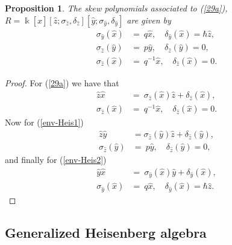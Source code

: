 \documentclass[12pt,a4paper]{article}
\theoremstyle{plain}
\newtheorem{proposition}[theorem]{Proposition}
\theoremstyle{definition}
\theoremstyle{remark}
\begin{document}
\begin{proposition}
  The skew polynomials associated to \rm(\ref{29a}), $R=\Bbbk [\hat{x}][\hat{z};\sigma_{\hat{z}},\delta_{\hat{z}}][\hat{y};\sigma_{\hat{y}}, \delta_{\hat{y}}]$ are given by
  \begin{align}
     \sigma_{\hat{y}}(\hat{x}) & = \ q\hat{x}, \quad \delta_{\hat{y}}(\hat{x})=\hbar\hat{z},\\
      \sigma_{\hat{z}}(\hat{y}) & = \ p\hat{y}, \quad \delta_{\hat{z}}(\hat{y})=0,\\
      \sigma_{\hat{z}}(\hat{x}) & = \ q^{-1}\hat{x}, \quad \delta_{\hat{z}}(\hat{x})=0.
  \end{align}
  \end{proposition}
\begin{proof}
    For (\ref{29a}) we have that
    \begin{align*}
    \hat{z}\hat{x} & = \ \sigma_{\hat{z}}(\hat{x})\hat{z}+\delta_{\hat{z}}(\hat{x}),\\
    \sigma_{\hat{z}}(\hat{x}) & =\ q^{-1}\hat{x}, \quad \delta_{\hat{z}}(\hat{x})=0.
    \end{align*}
    Now for (\ref{env-Heis1}) 
    \begin{align*}
    \hat{z}\hat{y} & = \sigma_{\hat{z}}(\hat{y})\hat{z}+\delta_{\hat{z}}(\hat{y}),\\
    \sigma_{\hat{z}}(\hat{y}) & = \ p\hat{y}, \quad \delta_{\hat{z}}(\hat{y})=0,
    \end{align*}
    and finally for (\ref{env-Heis2})
    \begin{align*}
        \hat{y}\hat{x} & = \ \sigma_{\hat{y}}(\hat{x})\hat{y}+\delta_{\hat{y}}(\hat{x}),\\
        \sigma_{\hat{y}}(\hat{x}) & = \ q\hat{x}, \quad \delta_{\hat{y}}(\hat{x})=\hbar\hat{z}.
    \end{align*}
\end{proof}

\subsection{Generalized Heisenberg algebra}
\end{document}
